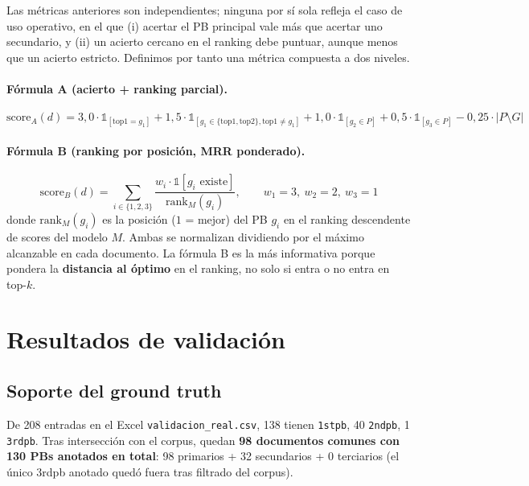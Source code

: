 \documentclass[11pt,a4paper]{article}
\begin{document}
Las métricas anteriores son independientes; ninguna por sí sola refleja el caso de uso operativo, en el que (i) acertar el PB principal vale más que acertar uno secundario, y (ii) un acierto cercano en el ranking debe puntuar, aunque menos que un acierto estricto. Definimos por tanto una métrica compuesta a dos niveles.

\paragraph{Fórmula A (acierto + ranking parcial).}
\begin{equation}
\text{score}_A(d) = 3{,}0 \cdot \mathbb{1}_{[\text{top1}=g_1]} + 1{,}5 \cdot \mathbb{1}_{[g_1 \in \{\text{top1},\text{top2}\}, \text{top1} \neq g_1]} + 1{,}0 \cdot \mathbb{1}_{[g_2 \in P]} + 0{,}5 \cdot \mathbb{1}_{[g_3 \in P]} - 0{,}25 \cdot |P \setminus G|
\end{equation}

\paragraph{Fórmula B (ranking por posición, MRR ponderado).}
\begin{equation}
\text{score}_B(d) = \sum_{i \in \{1,2,3\}} \frac{w_i \cdot \mathbb{1}[g_i \text{ existe}]}{\text{rank}_M(g_i)}, \qquad w_1=3,\ w_2=2,\ w_3=1
\end{equation}
donde $\text{rank}_M(g_i)$ es la posición ($1$ = mejor) del PB $g_i$ en el ranking descendente de scores del modelo $M$. Ambas se normalizan dividiendo por el máximo alcanzable en cada documento. La fórmula B es la más informativa porque pondera la \textbf{distancia al óptimo} en el ranking, no solo si entra o no entra en top-$k$.

\section{Resultados de validación}

\subsection{Soporte del ground truth}

De 208 entradas en el Excel \texttt{validacion\_real.csv}, 138 tienen \texttt{1stpb}, 40 \texttt{2ndpb}, 1 \texttt{3rdpb}. Tras intersección con el corpus, quedan \textbf{98 documentos comunes con 130 PBs anotados en total}: 98 primarios + 32 secundarios + 0 terciarios (el único 3rdpb anotado quedó fuera tras filtrado del corpus).
\end{document}

